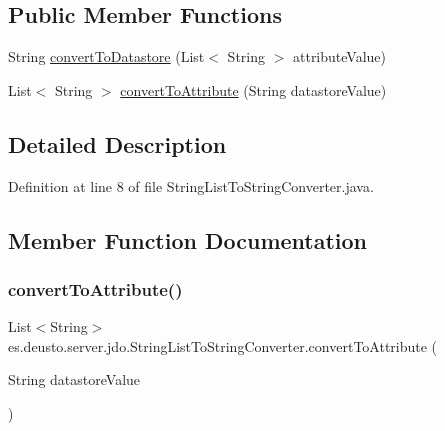 \subsection*{Public Member Functions}
\begin{DoxyCompactItemize}
\item 
String \mbox{\hyperlink{classes_1_1deusto_1_1server_1_1jdo_1_1_string_list_to_string_converter_a97a5081037fd91b4787b2c9cc8992c5f}{convert\+To\+Datastore}} (List$<$ String $>$ attribute\+Value)
\item 
List$<$ String $>$ \mbox{\hyperlink{classes_1_1deusto_1_1server_1_1jdo_1_1_string_list_to_string_converter_a2de7e8189ada32031fcbadd6077f8e7b}{convert\+To\+Attribute}} (String datastore\+Value)
\end{DoxyCompactItemize}


\subsection{Detailed Description}


Definition at line 8 of file String\+List\+To\+String\+Converter.\+java.



\subsection{Member Function Documentation}
\mbox{\label{classes_1_1deusto_1_1server_1_1jdo_1_1_string_list_to_string_converter_a2de7e8189ada32031fcbadd6077f8e7b}} 
\subsubsection{\texorpdfstring{convertToAttribute()}{convertToAttribute()}}
{\footnotesize\ttfamily List$<$String$>$ es.\+deusto.\+server.\+jdo.\+String\+List\+To\+String\+Converter.\+convert\+To\+Attribute (\begin{DoxyParamCaption}\item[{String}]{datastore\+Value }\end{DoxyParamCaption})}



